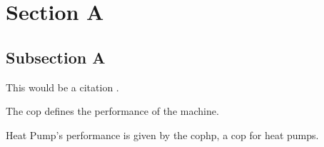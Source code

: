 \section{Section A}
\label{sec:sectiona}

\subsection{Subsection A}
\label{subsec:subasectionA}

This would be a citation \cite{dummy}.

The \gls{cop} defines the performance of the machine.

Heat Pump's performance is given by the \gls{cophp}, a \gls{cop} for heat pumps.
